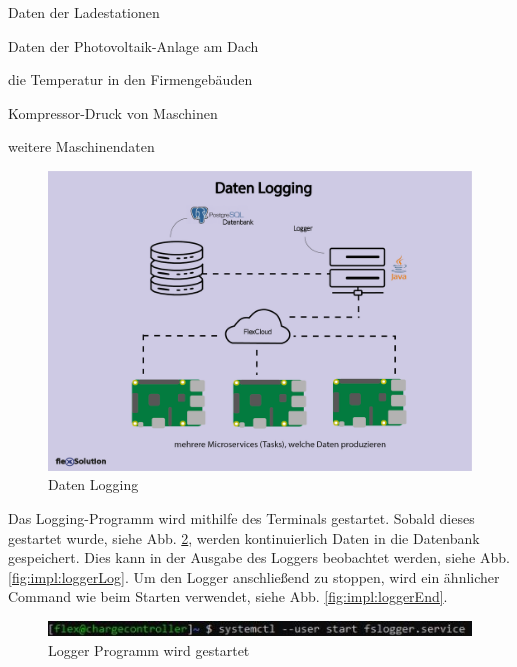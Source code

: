 \begin{compactitem}
    \item Daten der Ladestationen
    \item Daten der Photovoltaik-Anlage am Dach
    \item die Temperatur in den Firmengebäuden
    \item Kompressor-Druck von Maschinen
    \item weitere Maschinendaten
\end{compactitem}

\begin{figure}[h t]
    \centering
    \includegraphics[scale=0.7]{pics/datenlogging.png}
    \caption{Daten Logging}
    \label{fig:impl:datenlogging}
\end{figure}

Das Logging-Programm wird mithilfe des Terminals gestartet. Sobald dieses gestartet wurde, siehe Abb. \ref{fig:impl:loggerStart}, werden kontinuierlich Daten in die Datenbank gespeichert. Dies kann in der Ausgabe des Loggers beobachtet werden, siehe Abb. \ref{fig:impl:loggerLog}. Um den Logger anschließend zu stoppen, wird ein ähnlicher Command wie beim Starten verwendet, siehe Abb. \ref{fig:impl:loggerEnd}.

\begin{figure}[h t]
    \centering
    \includegraphics[scale=1.3]{pics/loggerStart.JPG}
    \caption{Logger Programm wird gestartet}
    \label{fig:impl:loggerStart}
\end{figure}

